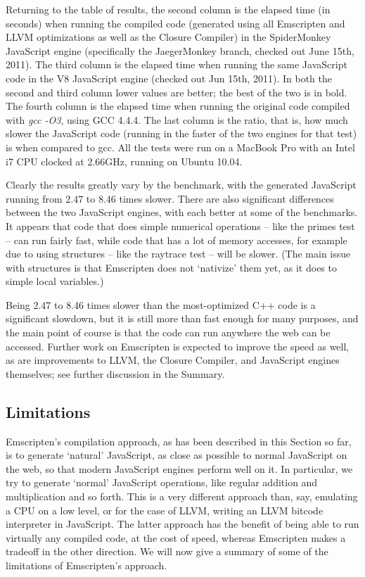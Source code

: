 \documentclass[preprint,10pt]{sigplanconf}
\begin{document}
Returning to the table of results, the second
column is the elapsed time (in seconds) when running the compiled code (generated using all Emscripten and LLVM
optimizations as well as the Closure Compiler) in the SpiderMonkey JavaScript
engine (specifically the JaegerMonkey branch, checked out June 15th, 2011).
The third column is the elapsed time when running the same JavaScript code in the V8 JavaScript engine
(checked out Jun 15th, 2011). In both the second and third column lower values
are better; the best of the two is in bold.
The fourth column is the elapsed time when running the original code compiled with \emph{gcc -O3},
using GCC 4.4.4. The last column is the ratio, that is, how much slower the JavaScript code
(running in the faster of the two engines for that test) is
when compared to gcc. All the tests were run on a MacBook Pro with
an Intel i7 CPU clocked at 2.66GHz, running on Ubuntu 10.04.

Clearly the results greatly vary by the benchmark, with the generated JavaScript running from 2.47 to 8.46 times
slower. There are also significant differences between the two JavaScript engines, with each better
at some of the benchmarks.
It appears that code that does simple numerical operations -- like
the primes test -- can run fairly fast, while code that has a lot of memory
accesses, for example due to using structures -- like the raytrace test --
will be slower. (The main issue with structures is that Emscripten does not
`nativize' them yet, as it does to simple local variables.)

Being 2.47 to 8.46 times slower than the most-optimized C++ code
is a significant slowdown, but it is still more than fast enough for
many purposes, and the main point of course is that the code can run
anywhere the web can be accessed. Further work on Emscripten is expected to
improve the speed as well, as are improvements to LLVM, the Closure
Compiler, and JavaScript engines themselves; see further discussion
in the Summary.

\subsection{Limitations}

Emscripten's compilation approach, as has been described in this Section so far,
is to generate `natural' JavaScript, as close as possible to normal JavaScript
on the web, so that modern JavaScript engines perform well on it. In particular,
we try to generate `normal' JavaScript operations, like regular addition and
multiplication and so forth. This is a very
different approach than, say, emulating a CPU on a low level, or for the case
of LLVM, writing an LLVM bitcode interpreter in JavaScript. The latter approach
has the benefit of being able to run virtually any compiled code, at the cost
of speed, whereas Emscripten makes a tradeoff in the other direction. We will
now give a summary of some of the limitations of Emscripten's approach.
\end{document}
